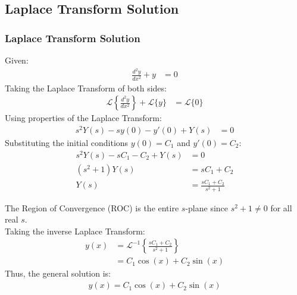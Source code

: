 \documentclass{beamer}
\theoremstyle{remark}
\numberwithin{equation}{section}
\begin{document}
	\subsection{Laplace Transform Solution}
	\begin{frame}[allowframebreaks]
		\frametitle{Laplace Transform Solution}
		Given:
		\begin{align}
			\frac{d^2y}{dx^2} + y &= 0
		\end{align}
		Taking the Laplace Transform of both sides:
		\begin{align}
			\mathcal{L}\left\{\frac{d^2y}{dx^2}\right\} + \mathcal{L}\{y\} &= \mathcal{L}\{0\}
		\end{align}
		Using properties of the Laplace Transform:
		\begin{align}
			s^2Y(s) - sy(0) - y'(0) + Y(s) &= 0
		\end{align}
		Substituting the initial conditions \( y(0) = C_1 \) and \( y'(0) = C_2 \):
		\begin{align}
			s^2Y(s) - sC_1 - C_2 + Y(s) &= 0\\
			\left(s^2 + 1\right)Y(s) &= sC_1 + C_2\\
			Y(s) &= \frac{sC_1 + C_2}{s^2 + 1}
		\end{align}
		
		The Region of Convergence (ROC) is the entire \( s \)-plane since \( s^2 + 1 \neq 0 \) for all real \( s \).\\
		Taking the inverse Laplace Transform:
		\begin{align}
			y(x) &= \mathcal{L}^{-1}\left\{\frac{sC_1 + C_2}{s^2 + 1}\right\}\\
			&= C_1\cos(x) + C_2\sin(x)
		\end{align}
		Thus, the general solution is:
		\begin{align}
			y(x) = C_1\cos(x) + C_2\sin(x)
		\end{align}
	\end{frame}
	
\end{document}
